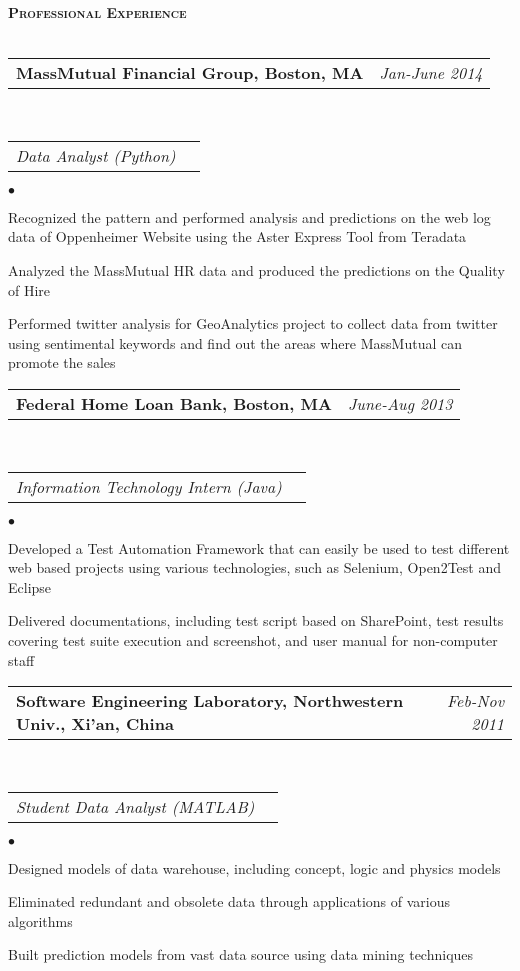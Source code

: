 \documentclass[11pt]{article}
\makeatletter
\newcommand{\lineunder}{\vspace*{-8pt} \\ \hspace*{-18pt} \hrulefill \\}
\newcommand{\header}[1]{{\hspace*{-15pt}\vspace*{6pt} \large \textsc{\textbf{#1}}} \vspace*{-6pt} \lineunder}
\newenvironment{achievements}{\begin{list}{$\bullet$}{\topsep 0pt \itemsep -2pt}}{\vspace*{4pt}\end{list}}
\newcommand{\headerrow}[2]
{\begin{tabular*}{\linewidth}{l@{\extracolsep{\fill}}r}
	\hspace*{-15pt}#1 & #2 \\
\end{tabular*}}
\newcommand{\headerrowww}[1]
{\begin{tabular*}{\linewidth}{l@{\extracolsep{\fill}}r}
	#1 &\\
\end{tabular*}}
\makeatother
\begin{document}
\vspace*{2.5pt}
\header{Professional Experience}

\headerrow
{\textbf{MassMutual Financial Group, Boston, MA}}
{\emph{Jan-June 2014}}
\\
\headerrowww
{\emph{Data Analyst (Python)}}
	\begin{achievements}
	\item Recognized the pattern and performed analysis and predictions on the web log data of Oppenheimer Website using the Aster Express Tool from Teradata
	\item Analyzed the MassMutual HR data and produced the predictions on the Quality of Hire
	\item Performed twitter analysis for GeoAnalytics project to collect data from twitter using sentimental keywords and find out the areas where MassMutual can promote the sales
	\end{achievements}
	

\headerrow
{\textbf{Federal Home Loan Bank, Boston, MA}}
{\emph{June-Aug 2013}}
\\
\headerrowww
{\emph{Information Technology Intern (Java)}}
	\begin{achievements}
	\item Developed a Test Automation Framework that can easily be used to test different web based projects 
	using various technologies, such as Selenium, Open2Test and Eclipse
	\item Delivered  documentations, including test script based on SharePoint, test results covering 
	test suite execution and screenshot, and user manual for non-computer staff 
	\end{achievements}
	
\headerrow
{\textbf{Software Engineering Laboratory, Northwestern Univ., Xi'an, China}}
{\emph{Feb-Nov 2011}}
\\
\headerrowww
{\emph{Student Data Analyst (MATLAB)}}
	\begin{achievements}
	\item Designed models of data warehouse, including concept, logic and physics models
	\item Eliminated redundant and obsolete data through applications of various algorithms
	\item Built prediction models from vast data source using data mining techniques
	\end{achievements}
	
\end{document}
